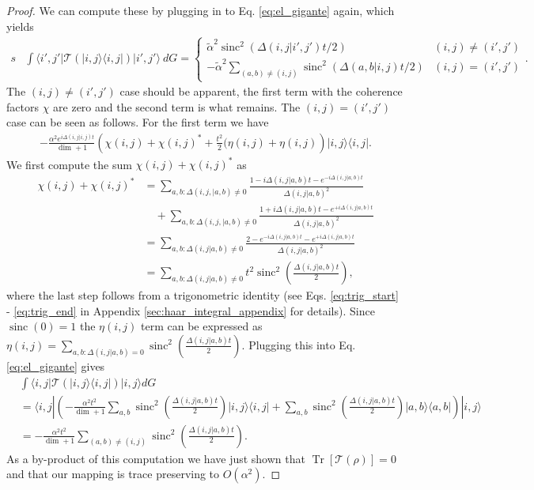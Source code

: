 \documentclass{article}
\newcommand{\ket}[1]{|#1\rangle}
\newcommand{\bra}[1]{\langle #1|}
\newcommand{\ketbra}[2]{| #1\rangle\! \langle #2|}
\newcommand{\brackets}[1]{\left[ #1 \right]}
\newcommand{\bigo}[1]{O\left(#1\right)}
\DeclareMathOperator{\Tr}{Tr}
\newcommand{\trace}[1]{\Tr \brackets{ #1 }}
\DeclareMathOperator{\sinc}{sinc}
\begin{document}
\begin{proof}
We can compute these by plugging in to Eq. \eqref{eq:el_gigante} again, which yields
\begin{align}s
&\int \bra{i', j'} \mathcal{T} \left( \ketbra{i, j}{i, j} \right) \ket{i', j'} ~dG = \begin{cases}        
\widetilde{\alpha}^2 \sinc^2(\Delta(i,j | i', j') t /2) & (i, j) \neq (i', j') \\
            - \widetilde{\alpha}^2 \sum_{(a,b) \neq (i, j)} \sinc^2(\Delta(a,b|i,j) t / 2) & (i,j) = (i', j')
        \end{cases}. \label{eq:system_environment_transitions}
    \end{align}
    The $(i, j) \neq (i', j')$ case should be apparent, the first term with the coherence factors $\chi$ are zero and the second term is what remains. The $(i,j) = (i', j')$ case can be seen as follows. For the first term we have
    \begin{align}
        - \frac{\alpha^2 e^{i \Delta(i,j| i,j) t}}{\dim + 1}\left(\chi(i,j) + \chi(i,j)^* + \frac{t^2}{2}(\eta(i,j) + \eta(i,j) \right) \ketbra{i,j}{i,j}.
    \end{align}
    We first compute the sum $\chi(i,j) + \chi(i,j)^*$ as
    \begin{align}
        \chi(i,j) + \chi(i,j)^* &= \sum_{a,b: \Delta(i,j,|a,b) \neq 0} \frac{1 - i \Delta(i,j|a,b)t - e^{-i \Delta(i,j|a,b) t}}{\Delta(i,j|a,b)^2} \nonumber\\
&\quad+ \sum_{a,b: \Delta(i,j,|a,b) \neq 0} \frac{1 + i \Delta(i,j|a,b)t - e^{+i \Delta(i,j|a,b) t}}{\Delta(i,j|a,b)^2} \\
    &= \sum_{a,b: \Delta(i,j| a,b) \neq 0} \frac{2 - e^{-i \Delta(i,j| a,b) t} - e^{+i \Delta(i,j| a,b) t}}{\Delta(i,j|a,b)^2} \\
    &= \sum_{a,b: \Delta(i,j| a,b) \neq 0} t^2 \sinc^2 \left( \frac{\Delta(i,j| a,b) t}{2} \right),
    \end{align}
    where the last step follows from a trigonometric identity (see Eqs. \eqref{eq:trig_start} - \eqref{eq:trig_end} in Appendix \ref{sec:haar_integral_appendix} for details). Since $\sinc(0) = 1$ the $\eta(i,j)$ term can be expressed as $\eta(i,j) = \sum_{a,b : \Delta(i,j|a,b) = 0} \sinc^2 \left( \frac{\Delta(i,j| a,b) t}{2} \right)$. Plugging this into Eq. \eqref{eq:el_gigante} gives
    \begin{align}
        &\int \bra{i,j} \mathcal{T} (\ketbra{i,j}{i,j}) \ket{i,j} dG \\
        &= \bra{i,j} \left(-\frac{\alpha^2 t^2}{\dim + 1} \sum_{a,b} \sinc^2 \left( \frac{\Delta(i,j| a,b) t}{2} \right) \ketbra{i,j}{i,j} + \sum_{a,b} \sinc^2\left( \frac{\Delta(i,j | a,b)t}{2} \right) \ketbra{a,b}{a,b} \right) \ket{i,j} \\
        &= -\frac{\alpha^2 t^2}{\dim + 1} \sum_{(a,b) \neq (i,j)} \sinc^2 \left( \frac{\Delta(i,j| a,b) t}{2} \right).
    \end{align}
    As a by-product of this computation we have just shown that $\trace{\mathcal{T}(\rho)} = 0$ and that our mapping is trace preserving to $\bigo{\alpha^2}$.
\end{proof}
\end{document}
